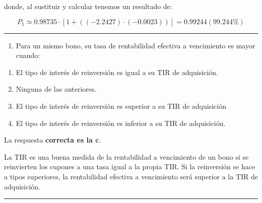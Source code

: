 \documentclass[
  letterpaper,
  DIV=11,
  numbers=noendperiod]{scrreprt}
\providecommand{\tightlist}{%
  \setlength{\itemsep}{0pt}\setlength{\parskip}{0pt}}\usepackage{longtable,booktabs,array}
\begin{document}
\begin{tcolorbox}
\begin{tcolorbox}[enhanced jigsaw, toprule=.15mm, left=2mm, arc=.35mm, breakable, bottomrule=.15mm, opacityback=0, rightrule=.15mm, leftrule=.75mm, colframe=quarto-callout-note-color-frame, colback=white]
\begin{minipage}[t]{\textwidth - 5.5mm}
donde, al sustituir y calcular tenemos un resultado de:

\[P_1\simeq 0.98735\cdot\left[1+((-2.2427)\cdot (-0.0023))\right]=0.99244(99.244\%)\]

\end{minipage}%
\end{tcolorbox}

\begin{center}\rule{0.5\linewidth}{0.5pt}\end{center}

\begin{enumerate}
\def\labelenumi{\arabic{enumi}.}
\setcounter{enumi}{8}
\tightlist
\item
  Para un mismo bono, su tasa de rentabilidad efectiva a vencimiento es
  mayor cuando:
\end{enumerate}

\begin{enumerate}
\def\labelenumi{\alph{enumi}.}
\item
  El tipo de interés de reinversión es igual a su TIR de adquisición.
\item
  Ninguna de las anteriores.
\item
  El tipo de interés de reinversión es superior a su TIR de adquisición
\item
  El tipo de interés de reinversión es inferior a su TIR de adquisición.
\end{enumerate}

\begin{tcolorbox}[enhanced jigsaw, toprule=.15mm, left=2mm, arc=.35mm, breakable, bottomrule=.15mm, opacityback=0, rightrule=.15mm, leftrule=.75mm, colframe=quarto-callout-note-color-frame, colback=white]
\begin{minipage}[t]{5.5mm}
\textcolor{quarto-callout-note-color}{\faInfo}
\end{minipage}%
\begin{minipage}[t]{\textwidth - 5.5mm}

La respuesta \textbf{correcta es la c}.

La TIR es una buena medida de la rentabilidad a vencimiento de un bono
si se reinvierten los cupones a una tasa igual a la propia TIR. Si la
reinversión se hace a tipos superiores, la rentabilidad efectiva a
vencimiento será superior a la TIR de adquisición.

\end{minipage}%
\end{tcolorbox}

\begin{center}\rule{0.5\linewidth}{0.5pt}\end{center}


\end{tcolorbox}
\end{document}
